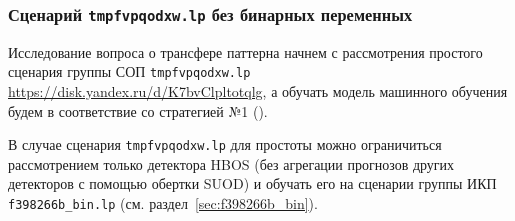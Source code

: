 \documentclass[%
	11pt,
	a4paper,
	utf8,
		]{article}
\begin{document}
\subsubsection{Сценарий \texttt{tmpfvpqodxw.lp} без бинарных переменных}

Исследование вопроса о трансфере паттерна начнем с рассмотрения простого сценария  группы СОП \texttt{tmpfvpqodxw.lp} \url{https://disk.yandex.ru/d/K7bvClpltotqlg}, а обучать модель машинного обучения будем в соответствие со стратегией №1 ().

В случае сценария \texttt{tmpfvpqodxw.lp} для простоты можно ограничиться рассмотрением только детектора HBOS (без агрегации прогнозов других детекторов с помощью обертки SUOD) и обучать его на сценарии группы ИКП \texttt{f398266b\_bin.lp} (см. раздел~\ref{sec:f398266b_bin}).
\end{document}
